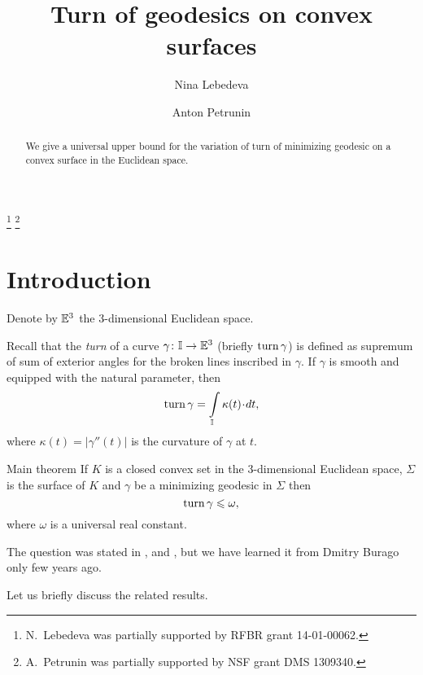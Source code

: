 \documentclass[a4paper,10pt]{amsart}
\begin{document}
\title{Turn of geodesics on convex surfaces}
\author{Nina Lebedeva}
\address{N. Lebedeva\newline\vskip-4mm
Math. Dept.
St. Petersburg State University,
Universitetsky pr., 28, 
Stary Peterhof, 
198504, Russia.
\newline\vskip-4mm
Steklov Institute,
27 Fontanka, St. Petersburg, 
191023, Russia.}
\author{Anton Petrunin}
\address{A. Petrunin\newline\vskip-4mm
Math. Dept. PSU,
University Park, PA 16802,
USA}
\thanks{N.~Lebedeva was partially supported by RFBR grant 
14-01-00062.}
\thanks{A.~Petrunin was partially supported by NSF grant DMS 1309340.}


\date{}

\begin{abstract}
We give a universal upper bound for the variation of turn of minimizing geodesic on a convex surface in the Euclidean space.
\end{abstract}
\maketitle


\section{Introduction}

Denote by $\mathbb{E}^3$ the 3-dimensional Euclidean space.

Recall that the \emph{turn} of a curve $\gamma\colon\mathbb{I}\to \mathbb{E}^3$ 
(briefly $\mathop{\rm turn}\nolimits\gamma$)
is defined as supremum of sum of exterior angles 
for the broken lines inscribed in $\gamma$.
If $\gamma$ is smooth and equipped with the natural parameter, 
then 
\[\turn\gamma=\int\limits_\II \kappa(t)\cdot dt,\]
where $\kappa(t)=|\gamma''(t)|$ is the curvature of $\gamma$ at $t$.

\begin{thm}{Main theorem}\label{thm:main}
If $K$ is a closed convex set in the 3-dimensional Euclidean space,
$\Sigma$ is the surface of $K$ 
and $\gamma$ be a minimizing geodesic in $\Sigma$
then 
\[\mathop{\rm turn}\nolimits\gamma\leqslant \omega,\]
where $\omega$ is a universal real constant.
\end{thm}

The question was stated in \cite{AH-PSV}, \cite{pach} and \cite{BKZ},
but we have learned it from Dmitry Burago only few years ago.

Let us briefly discuss the related results.
\end{document}
